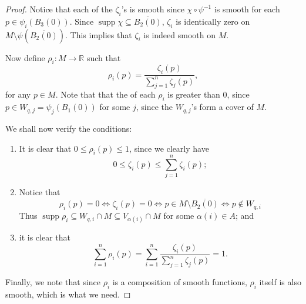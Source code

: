 \documentclass[notoc,notitlepage]{tufte-book}
\DeclareMathOperator{\supp}{supp}
\begin{document}
\begin{proof}
  Notice that each of the $\zeta_i$'s is smooth since $\chi \circ \psi^{-1}$ is
  smooth for each $p \in \psi_i(B_3(0))$. Since $\supp \chi \subseteq
  \overline{B_2(0)}$, $\zeta_i$ is identically zero on $M \setminus
  \psi(\overline{B_2(0)})$. This implies that $\zeta_i$ is indeed smooth on $M$.

  Now define $\rho_i : M \to \mathbb{R}$ such that
  \begin{equation*}
    \rho_i(p) = \frac{\zeta_i(p)}{\sum_{j=1}^{n} \zeta_j(p)},
  \end{equation*}
  for any $p \in M$. Note that that the  of each $\rho_i$
  is greater than $0$, since $p \in W_{q, j} = \psi_j(B_1(0))$ for some $j$, since the $W_{q,
  j}$'s form a cover of $M$. 

  We shall now verify the conditions:
  \begin{enumerate}
    \item It is clear that $0 \leq \rho_i(p) \leq 1$, since we clearly have
      \begin{equation*}
        0 \leq \zeta_i(p) \leq \sum_{j=1}^{n} \zeta_i(p);
      \end{equation*}
    \item Notice that
      \begin{equation*}
        \rho_i(p) = 0 \iff \zeta_i(p) = 0 \iff p \in M \setminus
        \overline{B_2(0)} \iff p \notin W_{q, i}
      \end{equation*}
      Thus $\supp \rho_i \subseteq W_{q, i} \cap M \subseteq V_{\alpha(i)} \cap
      M$ for some $\alpha(i) \in A$; and
    \item it is clear that
      \begin{equation*}
        \sum_{i=1}^{n} \rho_i(p) = \sum_{i=1}^{n}
        \frac{\zeta_i(p)}{\sum_{j=1}^{n} \zeta_j(p)} = 1.
      \end{equation*}
  \end{enumerate}
  Finally, we note that since $\rho_i$ is a composition of smooth functions,
  $\rho_i$ itself is also smooth, which is what we need.
\end{proof}
\end{document}
